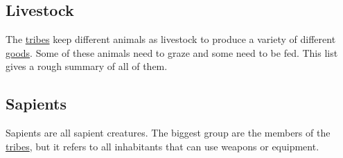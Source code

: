 \subsection{Livestock}\label{ch:World:Inhabitants:Livestock}

The \hyperref[ch:Tribes]{tribes} keep different animals as livestock to produce
a variety of different \hyperref[label]{goods}. Some of these animals need to
graze and some need to be fed. This list gives a rough summary of all of them.

\subsection{Sapients}\label{ch:World:Inhabitants:Sapients}

Sapients are all sapient creatures. The biggest group are the members of the
\hyperref[ch:Tribes]{tribes}, but it refers to all inhabitants that can use
weapons or equipment.

\printglossary[type=creature, title=Creature-Glossary]{}\label{ch:World:CreaturesGlossary}

